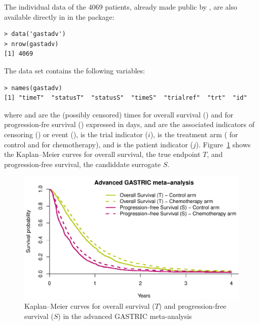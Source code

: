 \documentclass[]{scrartcl}\usepackage[]{graphicx}\usepackage[]{color}
\begin{document}
{{The individual data of the 4069 patients,
  already made public by \cite{BuyseEtal15},
are also available directly in  in the  package:
\begin{lstlisting}
> data('gastadv')
> nrow(gastadv)
[1] 4069
\end{lstlisting}

The data set contains the following variables:
\begin{lstlisting}
> names(gastadv)
[1] "timeT"  "statusT"  "statusS"  "timeS"  "trialref"  "trt"  "id"      
\end{lstlisting}
where  and  are the (possibly censored) times 
for overall survival () and
for progression-fre survival () expressed in days,
 and  are the associated indicators of
censoring () or event (),
 is the trial indicator ($i$),
 is the treatment arm ( for control and  for chemotherapy),
and  is the patient indicator ($j$).
Figure~\ref{fig:survCurves} shows the Kaplan--Meier curves for overall survival,
the true endpoint $T$, and progression-free survival,
the candiddate surrogate $S$.

\begin{figure}
\includegraphics[width=\textwidth]{./survCurves-1} \caption[Kaplan--Meier curves for overall survival (T) and progression-free survival (S) in the advanced GASTRIC meta-analysis \citep{GASTRIC13}]{Kaplan--Meier curves for overall survival ($T$) and progression-free survival ($S$) in the advanced GASTRIC meta-analysis \citep{GASTRIC13}}\label{fig:survCurves}
\end{figure}

  
}}
\end{document}
